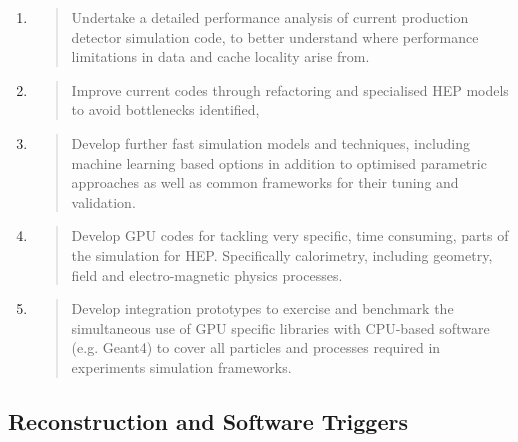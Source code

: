 \documentclass[10pt,a4paper]{article}
\begin{document}
\begin{enumerate}
\def\labelenumi{\arabic{enumi}.}
\item
  \begin{quote}
  Undertake a detailed performance analysis of current production
  detector simulation code, to better understand where performance
  limitations in data and cache locality arise from.
  \end{quote}
\item
  \begin{quote}
  Improve current codes through refactoring and specialised HEP models
  to avoid bottlenecks identified,
  \end{quote}
\item
  \begin{quote}
  Develop further fast simulation models and techniques, including
  machine learning based options in addition to optimised parametric
  approaches as well as common frameworks for their tuning and
  validation.
  \end{quote}
\item
  \begin{quote}
  Develop GPU codes for tackling very specific, time consuming, parts of
  the simulation for HEP. Specifically calorimetry, including geometry,
  field and electro-magnetic physics processes.
  \end{quote}
\item
  \begin{quote}
  Develop integration prototypes to exercise and benchmark the
  simultaneous use of GPU specific libraries with CPU-based software
  (e.g. Geant4) to cover all particles and processes required in
  experiments simulation frameworks.
  \end{quote}
\end{enumerate}

\hypertarget{reconstruction-and-software-triggers-1}{%
\subsection{Reconstruction and Software
Triggers}\label{reconstruction-and-software-triggers-1}}
\end{document}
